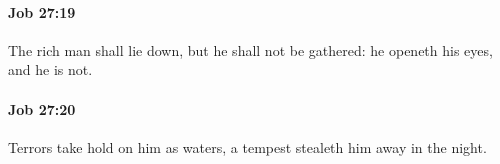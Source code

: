 		\paragraph{Job 27:19} %
			\label{JOB-27-19}

			The rich man shall lie down, but he shall not be gathered: he openeth his eyes, and he is not.


		\paragraph{Job 27:20} %
			\label{JOB-27-20}

			Terrors take hold on him as waters, a tempest stealeth him away in the night.


